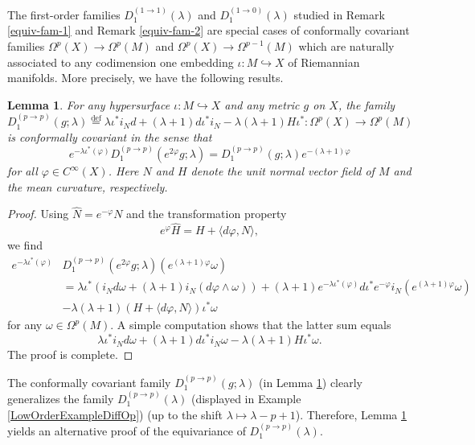 \documentclass[a4paper,12pt,reqno]{amsart}
\newtheorem{lem}[theorem]{Lemma}
\numberwithin{theorem}{subsection}
\numberwithin{equation}{section}
\begin{document}
The first-order families $D_1^{(1 \to 1)}(\lambda)$ and $D_1^{(1 \to
0)}(\lambda)$ studied in Remark \ref{equiv-fam-1} and Remark \ref{equiv-fam-2}
are special cases of conformally covariant families $\Omega^p(X) \to
\Omega^p(M)$ and $\Omega^p(X) \to \Omega^{p-1}(M)$ which are naturally
associated to any codimension one embedding $\iota: M \hookrightarrow X$ of
Riemannian manifolds. More precisely, we have the following results.

\begin{lem}\label{curved-first-type} For any hypersurface $\iota: M \hookrightarrow X$
and any metric $g$ on $X$, the family
$$
   D_1^{(p \to p)}(g;\lambda) {\stackrel{\text{def}}{=}} \lambda \iota^* i_N d + (\lambda\!+\!1) d \iota^*
   i_N - \lambda(\lambda\!+\!1) H \iota^*: \Omega^p(X) \to \Omega^{p}(M)
$$
is conformally covariant in the sense that
$$
   e^{-\lambda \iota^*(\varphi)} D_1^{(p \to p)}(e^{2\varphi}g;\lambda) =
   D_1^{(p \to p)}(g;\lambda) e^{-(\lambda+1)\varphi}
$$
for all $\varphi \in C^\infty(X)$. Here $N$ and $H$ denote the unit normal
vector field of $M$ and the mean curvature, respectively.
\end{lem}

\begin{proof} Using $\hat{N} = e^{-\varphi} N$ and the transformation property
\begin{equation}\label{mean}
    e^{\varphi} \hat{H} = H + \langle d\varphi, N \rangle,
\end{equation}
we find
\begin{align*}
   e^{-\lambda \iota^*(\varphi)} & D_1^{(p \to p)}(e^{2\varphi}g;\lambda)
   \left(e^{(\lambda+1)\varphi} \omega \right) \\
   & = \lambda \iota^* (i_N d \omega + (\lambda\!+\!1) i_N (d\varphi \wedge \omega))
   + (\lambda\!+\!1) e^{-\lambda \iota^*(\varphi)} d \iota^* e^{-\varphi} i_N
   \left(e^{(\lambda+1)\varphi} \omega \right) \\
   & -\lambda(\lambda\!+\!1) (H + \langle d\varphi,N \rangle) \iota^* \omega
\end{align*}
for any $\omega \in \Omega^p(M)$. A simple computation shows that the latter
sum equals
$$
\lambda \iota^* i_N d \omega + (\lambda\!+\!1) d \iota^* i_N \omega -
\lambda(\lambda\!+\!1) H \iota^* \omega.
$$
The proof is complete.
\end{proof}

The conformally covariant family $D_1^{(p\to p)}(g;\lambda)$ (in Lemma
\ref{curved-first-type}) clearly generalizes the family $D_1^{(p \to
p)}(\lambda)$ (displayed in Example \ref{LowOrderExampleDiffOp}) (up to the
shift $\lambda \mapsto \lambda-p+1$). Therefore, Lemma \ref{curved-first-type}
yields an alternative proof of the equivariance of $D_1^{(p \to p)}(\lambda)$.
\end{document}
